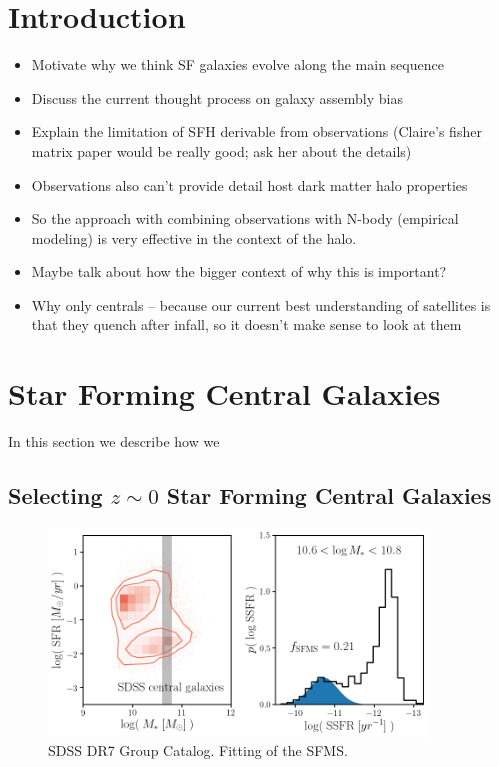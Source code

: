 \documentclass[12pt, letterpaper, preprint]{aastex}
\newcommand{\bitem}{\begin{itemize}}
\newcommand{\eitem}{\end{itemize}}
\begin{document}
\section{Introduction}
\bitem 
\item Motivate why we think SF galaxies evolve along the main sequence  
\item Discuss the current thought process on galaxy assembly bias 
\item Explain the limitation of SFH derivable from observations (Claire's fisher matrix paper would be really good; ask her about the details) 
\item Observations also can't provide detail host dark matter halo properties
\item So the approach with combining observations with N-body (empirical modeling) is very effective in the context of the halo.
\item Maybe talk about how the bigger context of why this is important?  
\item Why only centrals -- because our current best understanding of satellites is that they quench after infall, so it doesn't make sense to look at them
\eitem 
%
\section{}  

\section{Star Forming Central Galaxies}  
In this section we describe how we 
\subsection{Selecting $z \sim 0$ Star Forming Central Galaxies}  
\begin{figure}
\begin{center}
\includegraphics[width=0.9\textwidth]{figs/groupcat.png}
\caption{SDSS DR7 Group Catalog. Fitting of the SFMS.}
\label{fig:sfh_model}
\end{center}
\end{figure}
\end{document}
